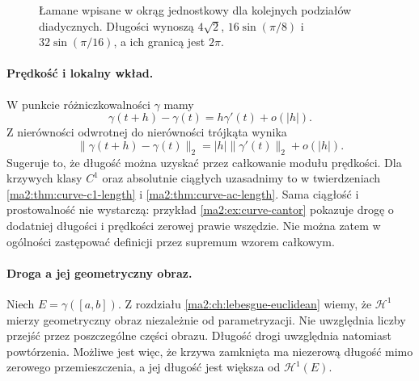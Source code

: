 \begin{figure}[htbp]
\centering
{}
\caption{Łamane wpisane w okrąg jednostkowy
dla kolejnych podziałów diadycznych.
Długości wynoszą $4\sqrt2$,
$16\sin(\pi/8)$ i $32\sin(\pi/16)$,
a ich granicą jest $2\pi$.}
\label{ma2:fig:curve-circle-polygons}
\end{figure}

\paragraph{Prędkość i lokalny wkład.}
W punkcie różniczkowalności $\gamma$
mamy
\[
 \gamma(t+h)-\gamma(t)=h\gamma'(t)+o(|h|).
\]
Z nierówności odwrotnej do nierówności
trójkąta wynika
\[
 \|\gamma(t+h)-\gamma(t)\|_2
 =|h|\|\gamma'(t)\|_2+o(|h|).
\]
Sugeruje to, że długość można uzyskać
przez całkowanie modułu prędkości.
Dla krzywych klasy $C^1$ oraz absolutnie
ciągłych uzasadnimy to w twierdzeniach
\ref{ma2:thm:curve-c1-length}
i \ref{ma2:thm:curve-ac-length}.
Sama ciągłość i prostowalność nie wystarczą:
przykład \ref{ma2:ex:curve-cantor} pokazuje
drogę o dodatniej długości i prędkości
zerowej prawie wszędzie.
Nie można zatem w ogólności zastępować
definicji przez supremum wzorem całkowym.

\paragraph{Droga a jej geometryczny obraz.}
Niech $E=\gamma([a,b])$. Z rozdziału
\ref{ma2:ch:lebesgue-euclidean} wiemy,
że $\mathcal H^1$ mierzy geometryczny
obraz niezależnie od parametryzacji.
Nie uwzględnia liczby przejść przez
poszczególne części obrazu.
Długość drogi uwzględnia natomiast
powtórzenia. Możliwe jest więc, że
krzywa zamknięta ma niezerową długość
mimo zerowego przemieszczenia, a jej
długość jest większa od $\mathcal H^1(E)$.

